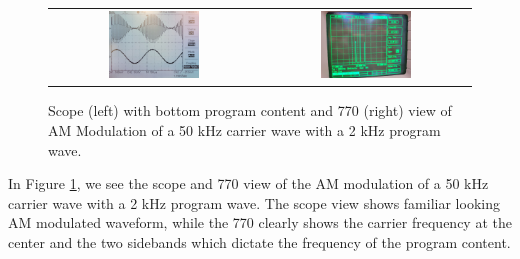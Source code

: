 \documentclass[../main.tex]{subfiles}
\begin{document}
\begin{figure}[ht]
    \centering
    \begin{tabular}{cc}
        \includegraphics[width=0.45\textwidth]{fig2_1.png} & \includegraphics[width=0.45\textwidth]{fig2_2.png}
    \end{tabular}
    \captionsetup{width=0.8\textwidth}
    \caption{Scope (left) with bottom program content and 770 (right) view of AM Modulation of a 50 kHz carrier wave with a 2 kHz program wave.}
    \label{fig:am_modulation}
\end{figure}

In Figure \ref{fig:am_modulation}, we see the scope and 770 view of the AM modulation of a 50 kHz carrier wave with a 2 kHz program wave.
The scope view shows familiar looking AM modulated waveform,
while the 770 clearly shows the carrier frequency at the center and the two sidebands which dictate the frequency of the program content.
\end{document}

